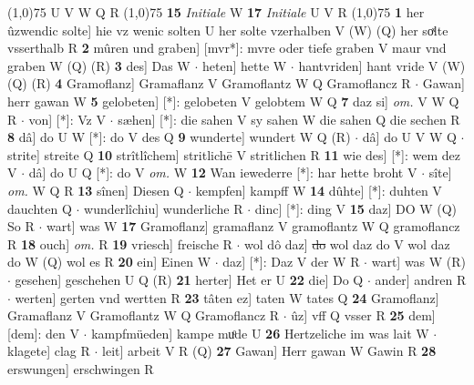 \documentclass[8pt,a4paper,notitlepage]{article}
\begin{document}
\begin{table}[ht]
\begin{minipage}[t]{0.5\linewidth}
\scriptsize
\line(1,0){75} \newline
U V W Q R \newline
\line(1,0){75} \newline
\textbf{15} \textit{Initiale} W  \textbf{17} \textit{Initiale} U V R  \newline
\line(1,0){75} \newline
\textbf{1} her ûzwendic solte] hie vz wenic solten U her solte vzerhalben V (W) (Q) her soͯlte vsserthalb R \textbf{2} mûren und graben] [mvr*]: mvre oder tiefe graben V maur vnd graben W (Q) (R) \textbf{3} des] Das W  $\cdot$ heten] hette W  $\cdot$ hantvriden] hant vride V (W) (Q) (R) \textbf{4} Gramoflanz] Gramaflanz V Gramoflantz W Q Gramoflancz R  $\cdot$ Gawan] herr gawan W \textbf{5} gelobeten] [*]: gelobeten V gelobtem W Q \textbf{7} daz si] \textit{om.} V W Q R  $\cdot$ von] [*]: Vz V  $\cdot$ sæhen] [*]: die sahen V sy sahen W die sahen Q die sechen R \textbf{8} dâ] do U W [*]: do V des Q \textbf{9} wunderte] wundert W Q (R)  $\cdot$ dâ] do U V W Q  $\cdot$ strite] streite Q \textbf{10} strîtlîchem] stritlichē V stritlichen R \textbf{11} wie des] [*]: wem dez V  $\cdot$ dâ] do U Q [*]: do V \textit{om.} W \textbf{12} Wan iewederre [*]: har hette broht V  $\cdot$ sîte] \textit{om.} W Q R \textbf{13} sînen] Diesen Q  $\cdot$ kempfen] kampff W \textbf{14} dûhte] [*]: duhten V dauchten Q  $\cdot$ wunderlîchiu] wunderliche R  $\cdot$ dinc] [*]: ding V \textbf{15} daz] DO W (Q) So R  $\cdot$ wart] was W \textbf{17} Gramoflanz] gramaflanz V gramoflantz W Q gramoflancz R \textbf{18} ouch] \textit{om.} R \textbf{19} vriesch] freische R  $\cdot$ wol dô daz] \sout{do} wol daz do V wol daz do W (Q) wol es R \textbf{20} ein] Einen W  $\cdot$ daz] [*]: Daz V der W R  $\cdot$ wart] was W (R)  $\cdot$ gesehen] geschehen U Q (R) \textbf{21} herter] Het er U \textbf{22} die] Do Q  $\cdot$ ander] andren R  $\cdot$ werten] gerten vnd wertten R \textbf{23} tâten ez] taten W tates Q \textbf{24} Gramoflanz] Gramaflanz V Gramoflantz W Q Gramoflancz R  $\cdot$ ûz] vff Q vsser R \textbf{25} dem] [dem]: den V  $\cdot$ kampfmüeden] kampe muͦde U \textbf{26} Hertzeliche im was lait W  $\cdot$ klagete] clag R  $\cdot$ leit] arbeit V R (Q) \textbf{27} Gawan] Herr gawan W Gawin R \textbf{28} erswungen] erschwingen R \newline
\end{minipage}
\end{table}
\end{document}
